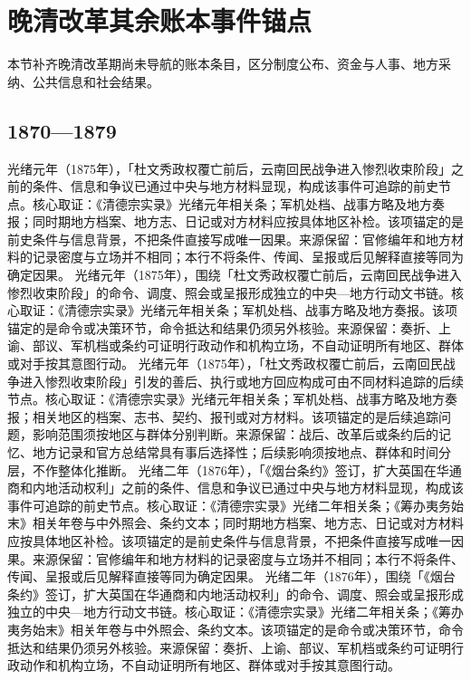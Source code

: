 \section{晚清改革其余账本事件锚点}
本节补齐晚清改革期尚未导航的账本条目，区分制度公布、资金与人事、地方采纳、公共信息和社会结果。
\subsection{1870—1879}
光绪元年（1875年），「杜文秀政权覆亡前后，云南回民战争进入惨烈收束阶段」之前的条件、信息和争议已通过中央与地方材料显现，构成该事件可追踪的前史节点。核心取证：《清德宗实录》光绪元年相关条；军机处档、战事方略及地方奏报；同时期地方档案、地方志、日记或对方材料应按具体地区补检。该项锚定的是前史条件与信息背景，不把条件直接写成唯一因果。来源保留：官修编年和地方材料的记录密度与立场并不相同；本行不将条件、传闻、呈报或后见解释直接等同为确定因果。
光绪元年（1875年），围绕「杜文秀政权覆亡前后，云南回民战争进入惨烈收束阶段」的命令、调度、照会或呈报形成独立的中央—地方行动文书链。核心取证：《清德宗实录》光绪元年相关条；军机处档、战事方略及地方奏报。该项锚定的是命令或决策环节，命令抵达和结果仍须另外核验。来源保留：奏折、上谕、部议、军机档或条约可证明行政动作和机构立场，不自动证明所有地区、群体或对手按其意图行动。
光绪元年（1875年），「杜文秀政权覆亡前后，云南回民战争进入惨烈收束阶段」引发的善后、执行或地方回应构成可由不同材料追踪的后续节点。核心取证：《清德宗实录》光绪元年相关条；军机处档、战事方略及地方奏报；相关地区的档案、志书、契约、报刊或对方材料。该项锚定的是后续追踪问题，影响范围须按地区与群体分别判断。来源保留：战后、改革后或条约后的记忆、地方记录和官方总结常具有事后选择性；后续影响须按地点、群体和时间分层，不作整体化推断。
光绪二年（1876年），「《烟台条约》签订，扩大英国在华通商和内地活动权利」之前的条件、信息和争议已通过中央与地方材料显现，构成该事件可追踪的前史节点。核心取证：《清德宗实录》光绪二年相关条；《筹办夷务始末》相关年卷与中外照会、条约文本；同时期地方档案、地方志、日记或对方材料应按具体地区补检。该项锚定的是前史条件与信息背景，不把条件直接写成唯一因果。来源保留：官修编年和地方材料的记录密度与立场并不相同；本行不将条件、传闻、呈报或后见解释直接等同为确定因果。
光绪二年（1876年），围绕「《烟台条约》签订，扩大英国在华通商和内地活动权利」的命令、调度、照会或呈报形成独立的中央—地方行动文书链。核心取证：《清德宗实录》光绪二年相关条；《筹办夷务始末》相关年卷与中外照会、条约文本。该项锚定的是命令或决策环节，命令抵达和结果仍须另外核验。来源保留：奏折、上谕、部议、军机档或条约可证明行政动作和机构立场，不自动证明所有地区、群体或对手按其意图行动。
